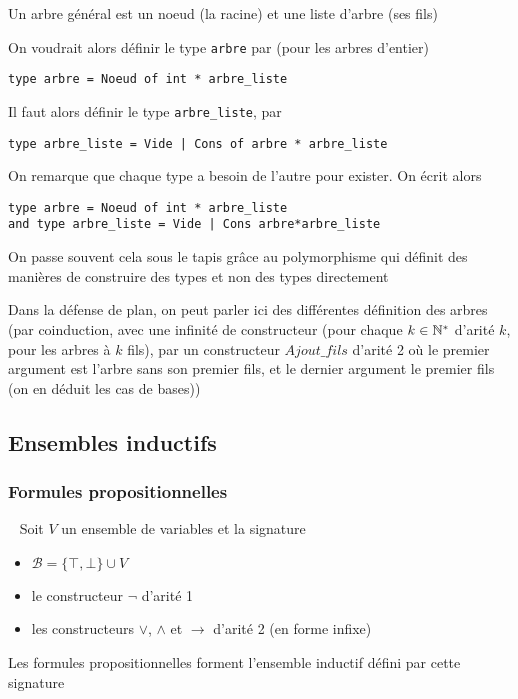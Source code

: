 \begin{definition}
	Un arbre général est un noeud (la racine) et une liste d'arbre (ses fils)
\end{definition}

On voudrait alors définir le type \texttt{arbre} par (pour les arbres d'entier)
\begin{lstlisting}
type arbre = Noeud of int * arbre_liste
\end{lstlisting}
Il faut alors définir le type \texttt{arbre\_liste}, par
\begin{lstlisting}
type arbre_liste = Vide | Cons of arbre * arbre_liste
\end{lstlisting}

On remarque que chaque type a besoin de l'autre pour exister. On écrit alors
\begin{lstlisting}
type arbre = Noeud of int * arbre_liste
and type arbre_liste = Vide | Cons arbre*arbre_liste
\end{lstlisting}

\begin{rem}
	On passe souvent cela sous le tapis grâce au polymorphisme qui définit des manières de construire des types et non des types directement
\end{rem}

\begin{com}
	Dans la défense de plan, on peut parler ici des différentes définition des arbres (par coinduction, avec une infinité de constructeur (pour chaque $k \in \mathbb{N}^*$ d'arité $k$, pour les arbres à $k$ fils), par un constructeur $Ajout\_fils$ d'arité 2 où le premier argument est l'arbre sans son premier fils, et le dernier argument le premier fils (on en déduit les cas de bases))
\end{com}

\subsection{Ensembles inductifs}

\subsubsection{Formules propositionnelles}

\begin{definition}~
	Soit $V$ un ensemble de variables et la signature \begin{itemize}
		\item $\mathcal B = \{ \top, \bot\} \cup V$
		\item le constructeur $\neg$ d'arité 1
		\item les constructeurs $\vee$, $\wedge$ et $\to$ d'arité 2 (en forme infixe)
	\end{itemize}
	Les formules propositionnelles forment l'ensemble inductif défini par cette signature
\end{definition}

